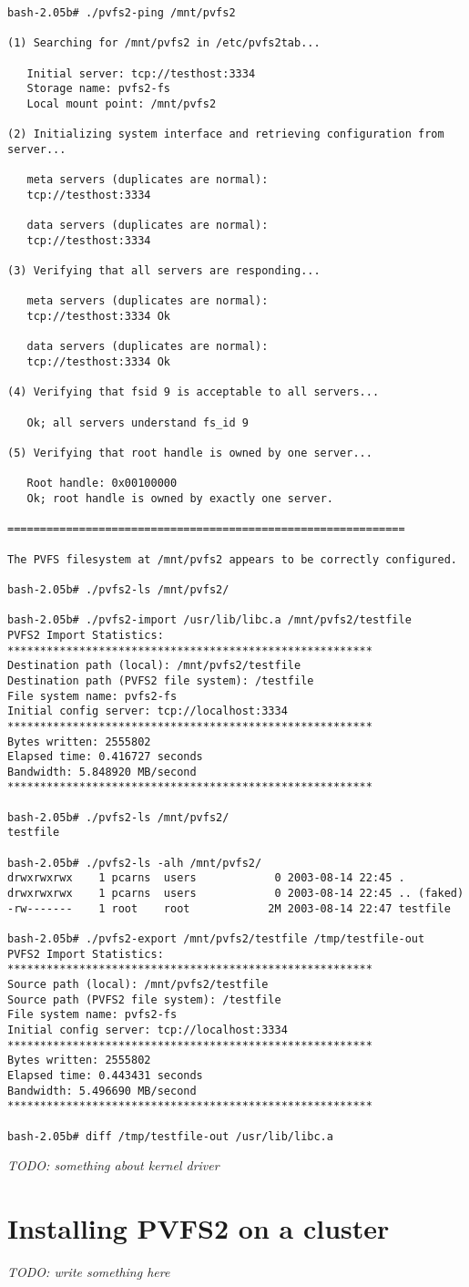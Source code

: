 \documentclass[11pt, letterpaper]{article}
\begin{document}
\begin{verbatim}
bash-2.05b# ./pvfs2-ping /mnt/pvfs2

(1) Searching for /mnt/pvfs2 in /etc/pvfs2tab...

   Initial server: tcp://testhost:3334
   Storage name: pvfs2-fs
   Local mount point: /mnt/pvfs2

(2) Initializing system interface and retrieving configuration from server...

   meta servers (duplicates are normal):
   tcp://testhost:3334

   data servers (duplicates are normal):
   tcp://testhost:3334

(3) Verifying that all servers are responding...

   meta servers (duplicates are normal):
   tcp://testhost:3334 Ok

   data servers (duplicates are normal):
   tcp://testhost:3334 Ok

(4) Verifying that fsid 9 is acceptable to all servers...

   Ok; all servers understand fs_id 9

(5) Verifying that root handle is owned by one server...

   Root handle: 0x00100000
   Ok; root handle is owned by exactly one server.

=============================================================

The PVFS filesystem at /mnt/pvfs2 appears to be correctly configured.

bash-2.05b# ./pvfs2-ls /mnt/pvfs2/

bash-2.05b# ./pvfs2-import /usr/lib/libc.a /mnt/pvfs2/testfile
PVFS2 Import Statistics:
********************************************************
Destination path (local): /mnt/pvfs2/testfile
Destination path (PVFS2 file system): /testfile
File system name: pvfs2-fs
Initial config server: tcp://localhost:3334
********************************************************
Bytes written: 2555802
Elapsed time: 0.416727 seconds
Bandwidth: 5.848920 MB/second
********************************************************

bash-2.05b# ./pvfs2-ls /mnt/pvfs2/
testfile

bash-2.05b# ./pvfs2-ls -alh /mnt/pvfs2/
drwxrwxrwx    1 pcarns  users            0 2003-08-14 22:45 .
drwxrwxrwx    1 pcarns  users            0 2003-08-14 22:45 .. (faked)
-rw-------    1 root    root            2M 2003-08-14 22:47 testfile

bash-2.05b# ./pvfs2-export /mnt/pvfs2/testfile /tmp/testfile-out
PVFS2 Import Statistics:
********************************************************
Source path (local): /mnt/pvfs2/testfile
Source path (PVFS2 file system): /testfile
File system name: pvfs2-fs
Initial config server: tcp://localhost:3334
********************************************************
Bytes written: 2555802
Elapsed time: 0.443431 seconds
Bandwidth: 5.496690 MB/second
********************************************************

bash-2.05b# diff /tmp/testfile-out /usr/lib/libc.a
\end{verbatim}

\emph{TODO: something about kernel driver}


\section{Installing PVFS2 on a cluster}

\emph{TODO: write something here}
\end{document}
